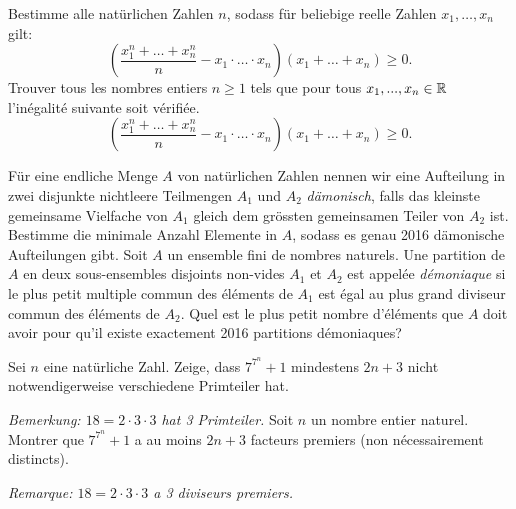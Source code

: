 \documentclass[language=french,style=exam]{smo} %
\begin{document}
\begin{enumerate}
{\item[\textbf{4.}] %
\ifgerman %
Bestimme alle natürlichen Zahlen $n$, sodass für beliebige reelle Zahlen $x_1, \ldots, x_n$ gilt:
\[
\left(\frac{x_1^n + \ldots + x_n^n}{n} - x_1 \cdot\ldots\cdot x_n\right) \left(x_1 + \ldots + x_n \right)  \geq 0.
\]
\fi
\iffrench %
Trouver tous les nombres entiers $n\geq 1$ tels que pour tous $x_1,...,x_n\in\mathbb{R}$ l'inégalité suivante soit vérifiée.
\[
\left(\frac{x_1^n + \ldots + x_n^n}{n} - x_1 \cdot\ldots\cdot x_n\right) \left(x_1 + \ldots + x_n \right)  \geq 0.
\]
\fi
\ifitalian %
\fi

\bigskip
\bigskip

\item[\textbf{5.}] %

\ifgerman %
Für eine endliche Menge $A$ von natürlichen Zahlen nennen wir eine Aufteilung in zwei disjunkte nichtleere Teilmengen $A_1$ und $A_2$ \emph{dämonisch}, falls das kleinste gemeinsame Vielfache von $A_1$ gleich dem grössten gemeinsamen Teiler von $A_2$ ist. Bestimme die minimale Anzahl Elemente in $A$, sodass es genau 2016 dämonische Aufteilungen gibt.
\fi
\iffrench %
Soit $A$ un ensemble fini de nombres naturels. Une partition de $A$ en deux sous-ensembles disjoints non-vides $A_1$ et $A_2$ est appelée \emph{démoniaque} si le plus petit multiple commun des éléments de $A_1$ est égal au plus grand diviseur commun des éléments de $A_2$. Quel est le plus petit nombre d'éléments que $A$ doit avoir pour qu'il existe exactement 2016 partitions démoniaques?
\fi
\ifitalian %

\fi

\bigskip
\bigskip

\item[\textbf{6.}] %
\ifgerman %
Sei $n$ eine natürliche Zahl. Zeige, dass $7^{7^{n}}+1$ mindestens $2n+3$ nicht notwendigerweise verschiedene Primteiler hat.

\textit{Bemerkung: $18 = 2\cdot 3\cdot 3$ hat 3 Primteiler.}
\fi
\iffrench %
Soit $n$ un nombre entier naturel. Montrer que $7^{7^{n}}+1$ a au moins $2n+3$ facteurs premiers (non nécessairement distincts).

\textit{Remarque: $18 = 2\cdot 3\cdot 3$ a 3 diviseurs premiers.}
\fi
\ifitalian %
\fi
}

\end{enumerate}
\end{document}
